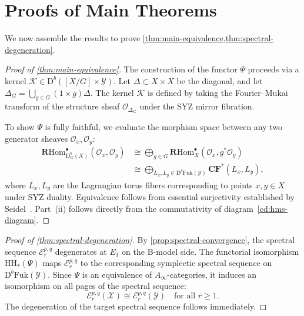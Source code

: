 \documentclass[12pt,reqno]{amsart}
\theoremstyle{plain}
\theoremstyle{definition}
\theoremstyle{remark}
\newcommand{\cO}{\mathcal{O}}
\newcommand{\cX}{\mathcal{X}}
\newcommand{\cY}{\mathcal{Y}}
\newcommand{\Db}{\mathrm{D}^b}
\newcommand{\RHom}{\mathbf{R}\mathrm{Hom}}
\newcommand{\Fuk}{\mathrm{Fuk}}
\newcommand{\HH}{\mathrm{HH}}
\numberwithin{equation}{section}
\begin{document}
\section{Proofs of Main Theorems}
\label{sec:proofs}

We now assemble the results to prove \cref{thm:main-equivalence,thm:spectral-degeneration}.

\begin{proof}[Proof of \cref{thm:main-equivalence}]
The construction of the functor $\Psi$ proceeds via a kernel $\mathcal{K} \in \Db( [X/G] \times \cY )$. Let $\Delta \subset X \times X$ be the diagonal, and let $\Delta_G = \bigcup_{g \in G} (1 \times g)\Delta$. The kernel $\mathcal{K}$ is defined by taking the Fourier--Mukai transform of the structure sheaf $\cO_{\Delta_G}$ under the SYZ mirror fibration.

To show $\Psi$ is fully faithful, we evaluate the morphism space between any two generator sheaves $\cO_x, \cO_y$:
\begin{equation}
\label{eq:hom-computation}
\begin{aligned}
\RHom^\bullet_{\Db_G(X)}(\cO_x, \cO_y) &\cong \bigoplus_{g \in G} \RHom^\bullet_X(\cO_x, g^* \cO_y) \\
&\cong \bigoplus_{L_x, L_y \in \Db\Fuk(\cY)} \mathbf{CF}^*(L_x, L_y),
\end{aligned}
\end{equation}
where $L_x, L_y$ are the Lagrangian torus fibers corresponding to points $x, y \in X$ under SYZ duality. Equivalence follows from essential surjectivity established by Seidel~\cite{Seidel2008}. Part~(ii) follows directly from the commutativity of diagram~\eqref{cd:hms-diagram}.
\end{proof}

\begin{proof}[Proof of \cref{thm:spectral-degeneration}]
By \cref{prop:spectral-convergence}, the spectral sequence $\mathcal{E}_r^{p,q}$ degenerates at $E_1$ on the B-model side. The functorial isomorphism $\HH_*(\Psi)$ maps $\mathcal{E}_r^{p,q}$ to the corresponding symplectic spectral sequence on $\Db\Fuk(\cY)$. Since $\Psi$ is an equivalence of $A_\infty$-categories, it induces an isomorphism on all pages of the spectral sequence:
\begin{equation}
\mathcal{E}_r^{p,q}(\cX) \cong \mathcal{E}_r^{p,q}(\cY) \quad \text{for all } r \ge 1.
\end{equation}
The degeneration of the target spectral sequence follows immediately.
\end{proof}
\end{document}
